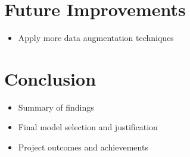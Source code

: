 \documentclass{article}
\begin{document}
\section{Future Improvements}
\begin{itemize}
    \item Apply more data augmentation techniques
\end{itemize}

\section{Conclusion}
\begin{itemize}
    \item Summary of findings
    \item Final model selection and justification
    \item Project outcomes and achievements
\end{itemize}
\end{document}
